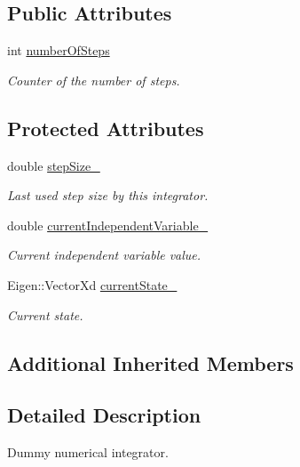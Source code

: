 \subsection*{Public Attributes}
\begin{DoxyCompactItemize}
\item 
int \hyperlink{classtudat_1_1unit__tests_1_1DummyNumericalIntegrator_a2b2a2f958f57ce022b8bd442a71c62be}{number\+Of\+Steps}
\begin{DoxyCompactList}\small\item\em Counter of the number of steps. \end{DoxyCompactList}\end{DoxyCompactItemize}
\subsection*{Protected Attributes}
\begin{DoxyCompactItemize}
\item 
double \hyperlink{classtudat_1_1unit__tests_1_1DummyNumericalIntegrator_a27977d4076722219595e7e623bc3c7a1}{step\+Size\+\_\+}
\begin{DoxyCompactList}\small\item\em Last used step size by this integrator. \end{DoxyCompactList}\item 
double \hyperlink{classtudat_1_1unit__tests_1_1DummyNumericalIntegrator_a2c55274d8e9f155d59aaa17451d59d7c}{current\+Independent\+Variable\+\_\+}
\begin{DoxyCompactList}\small\item\em Current independent variable value. \end{DoxyCompactList}\item 
Eigen\+::\+Vector\+Xd \hyperlink{classtudat_1_1unit__tests_1_1DummyNumericalIntegrator_ab2d46f039013f2f81de5e5d98de6ed64}{current\+State\+\_\+}
\begin{DoxyCompactList}\small\item\em Current state. \end{DoxyCompactList}\end{DoxyCompactItemize}
\subsection*{Additional Inherited Members}


\subsection{Detailed Description}
Dummy numerical integrator. 

